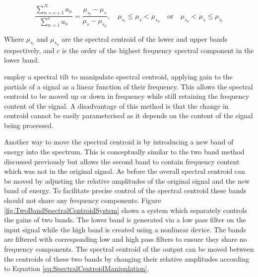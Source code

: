 			\begin{equation}
				\frac{\sum_{n = c + 1}^{N} a_{n}}
				     {{\sum_{n = 1}^{c} a_{n}}} = 
				\frac{\mu_{s_{l}} - \mu_{s}}{\mu_{s} - \mu_{s_{u}}}, 
				\quad \mu_{s_{l}} \leq \mu_{s} < \mu_{s_{u}} \quad \text{or} 
					\quad \mu_{s_{u}} < \mu_{s} \leq \mu_{s_{l}}
				\label{eq:SpectralCentroidManipulation}
			\end{equation}

			Where $\mu_{s_{l}}$ and $\mu_{s_{u}}$ are the spectral centroid of the lower and upper bands
			respectively, and $c$ is the order of the highest frequency spectral component in the lower band.

			\citet{williams2007perceptually} employ a spectral tilt to manipulate spectral centroid, applying
			gain to the partials of a signal as a linear function of their frequency. This allows the spectral
			centroid to be moved up or down in frequency while still retaining the frequency content of the
			signal. A disadvantage of this method is that the change in centroid cannot be easily parameterised
			as it depends on the content of the signal being processed.

			Another way to move the spectral centroid is by introducing a new band of energy into the spectrum.
			This is conceptually similar to the two band method discussed previously but allows the second band
			to contain frequency content which was not in the original signal. As before the overall spectral
			centroid can be moved by adjusting the relative amplitudes of the original signal and the new band
			of energy. To facilitate precise control of the spectral centroid these bands should not share any
			frequency components. Figure \ref{fig:TwoBandSpectralCentroidSystem} shows a system which
			separately controls the gains of two bands. The lower band is generated via a low pass filter on
			the input signal while the high band is created using a nonlinear device. The bands are filtered
			with corresponding low and high pass filters to ensure they share no frequency components. The
			spectral centroid of the output can be moved between the centroids of these two bands by changing
			their relative amplitudes according to Equation \ref{eq:SpectralCentroidManipulation}.

